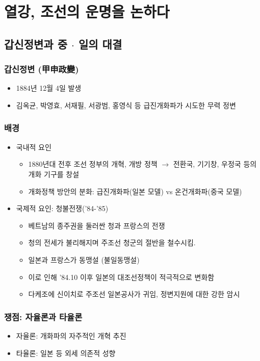 \section{열강, 조선의 운명을 논하다}

\subsection{갑신정변과 중 $\cdot$ 일의 대결}

\subsubsection*{갑신정변 (甲申政變)}
\begin{itemize}
    \item 1884년 12월 4일 발생
    \item 김옥균, 박영효, 서재필, 서광범, 홍영식 등 급진개화파가 시도한 무력 정변
\end{itemize}

\subsubsection*{배경}
\begin{itemize}
    \item 국내적 요인
    \begin{itemize}
        \item 1880년대 전후 조선 정부의 개혁, 개방 정책 $\rightarrow$ 전환국, 기기창, 우정국 등의 개화 기구를 창설
        \item 개화정책 방안의 분화: 급진개화파(일본 모델) vs 온건개화파(중국 모델)
    \end{itemize}
    \item 국제적 요인: 청불전쟁('84-'85)
    \begin{itemize}
        \item 베트남의 종주권을 둘러싼 청과 프랑스의 전쟁
        \item 청의 전세가 불리해지며 주조선 청군의 절반을 철수시킴.
        \item 일본과 프랑스가 동맹설 (불일동맹설)
        \item 이로 인해 '84.10 이후 일본의 대조선정책이 적극적으로 변화함
        \item 다케조에 신이치로 주조선 일본공사가 귀임, 정변지원에 대한 강한 암시
    \end{itemize}
\end{itemize}

\subsubsection*{쟁점: 자율론과 타율론}
\begin{itemize}
    \item 자율론: 개화파의 자주적인 개혁 추진
    \item 타율론: 일본 등 외세 의존적 성향
\end{itemize}

